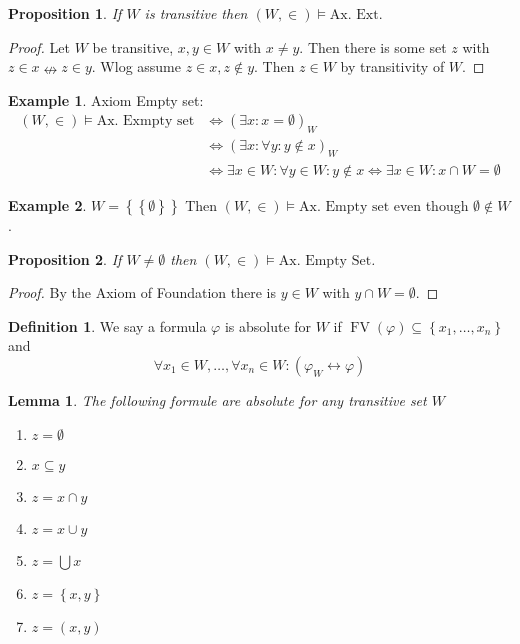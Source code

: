 \documentclass{scrartcl}
\newcommand{\set}[1]{\left\{#1\right\}}
\DeclareMathOperator{\FV}{FV}
\theoremstyle{definition}
\newtheorem*{definition*}{Definition}
\newtheorem*{example*}{Example}
\theoremstyle{plain}
\newtheorem*{proposition*}{Proposition}
\newtheorem*{lemma*}{Lemma}
\theoremstyle{remark}
\begin{document}
	\begin{proposition*}
		If $W$ is transitive then $(W, \in) \vDash \text{Ax. Ext.}$
	\end{proposition*}
	
	\begin{proof}
		Let $W$ be transitive, $x, y \in W$ with $x \neq y$. Then there is some set $z$ with $z \in x \nleftrightarrow z \in y$. Wlog assume $z \in x, z \notin y$. Then $z \in W$ by transitivity of $W$.
 	\end{proof}
	
	\begin{example*}
		Axiom Empty set: 
		\begin{align*}
			(W, \in) \vDash \text{Ax. Exmpty set} &\iff (\exists x: x = \emptyset)_W\\
			&\iff (\exists x: \forall y: y \notin x)_W\\
			&\iff \exists x \in W: \forall y \in W: y \notin x \iff \exists x \in W: x \cap W = \emptyset
		\end{align*}
	\end{example*}

	\begin{example*}
		$W = \set{\set{\emptyset}}$ Then $(W, \in) \vDash \text{Ax. Empty set}$ even though $\emptyset \notin W$.
	\end{example*}
	
	\begin{proposition*}
		If $W \neq \emptyset$ then $(W, \in) \vDash \text{Ax. Empty Set}$.
	\end{proposition*}

	\begin{proof}
		By the Axiom of Foundation there is $y \in W$ with $y \cap W = \emptyset$.
	\end{proof}
	
	\begin{definition*}
		We say a formula $\varphi$ is absolute for $W$ if $\FV(\varphi) \subseteq \set{x_1, \dots, x_n}$ and 
			\[\forall x_1 \in W, \dots, \forall x_n \in W: (\varphi_W \leftrightarrow \varphi)\]
	\end{definition*}

	\begin{lemma*}
		The following formule are absolute for any transitive set $W$
		\begin{enumerate}[1.]
			\item $z = \emptyset$
			\item $x \subseteq y$
			\item $z = x \cap y$
			\item $z = x \cup y$
			\item $z = \bigcup x$
			\item $z = \set{x, y}$
			\item $z = (x, y)$
		\end{enumerate}
	\end{lemma*}
\end{document}
